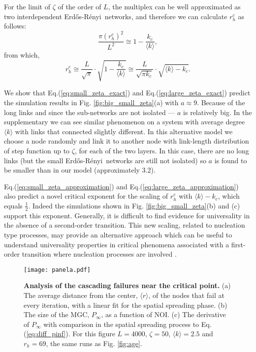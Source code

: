 \documentclass[twocolumn,noshowpacs,pre,preprintnumbers,superscriptaddress,amsmath,amssymb,floatfix]{revtex4}
\newcommand{\kk}{\langle k \rangle}
\newcommand{\er}{Erd\H{o}s-R\'{e}nyi}
\begin{document}
	For the limit of $\zeta$ of the order of $L$, the multiplex can be well approximated as two interdependent \er~networks, and therefore we can calculate $r_h^c$ as follows:
	\begin{equation}
	\frac{\pi (r_{h}^{c})^{2}}{L^2} \cong 1 - \frac{k_c}{\kk},
	\label{eq:large_zeta_exact}
	\end{equation}
	from which,
	\begin{equation}
	r_{h}^{c} \cong \frac{L}{\sqrt{\pi}} \cdot \sqrt{1 - \frac{k_c}{\kk}} \cong \frac{L}{\sqrt{\pi k_c}} \cdot \sqrt{\kk - k_c}\label{eq:large_zeta_approximation}.
	\end{equation}
	
	We show that Eq.(\ref{eq:small_zeta_exact}) and Eq.(\ref{eq:large_zeta_exact}) predict the simulation results in Fig. \ref{fig:big_small_zeta}(a) with $a \approx 9$.
	Because of the long links and since the sub-networks are not isolated ---
	$a$ is relatively big.
	In the supplementary we can see similar phenomenon on a system with average degree $\kk$ with links that connected slightly different. In this alternative model we choose a node randomly and link it to another node with link-length distribution of step function up to $\zeta$, for each of the two layers.
	In this case, there are no long links (but the small \er~networks are still not isolated) so $a$ is found to be smaller than in our model (approximately 3.2).
	
	Eq.(\ref{eq:small_zeta_approximation}) and Eq.(\ref{eq:large_zeta_approximation}) also predict a novel critical exponent for the scaling of $r_h^c$ with $\kk - k_c$, which equals $\frac{1}{2}$. Indeed the simulations shown in  Fig. \ref{fig:big_small_zeta}(b) and (c) support this exponent. 
	Generally, it is difficult to find evidence for universality in the absence of a second-order transition. This new scaling, related to nucleation type processes, may provide an alternative approach which can be useful to understand universality properties in critical phenomena associated with a first-order transition where nucleation processes are involved \cite{mcgraw-prl1996,talanquer-jcp1997}.
	
	\begin{figure}
		\texttt{[image: panela.pdf]}
		\caption{\textbf{Analysis of the cascading failures near the critical point.} 
			(a) The average distance from the center, $\langle r \rangle$, of the nodes that fail at every iteration, with a linear fit for the spatial spreading phase. 
			(b) The size of the MGC, $P_\infty$, as a function of NOI.
			(c) The derivative of $P_\infty$ with comparison in the spatial spreading process to Eq. (\ref{eq:diff_pinf}).
			For this figure $L = 4000$, $\zeta = 50$, $\kk = 2.5$ and $r_h = 69$, the same runs as Fig. \ref{fig:age}.}
		\label{fig:age3}
	\end{figure}
	
\end{document}
